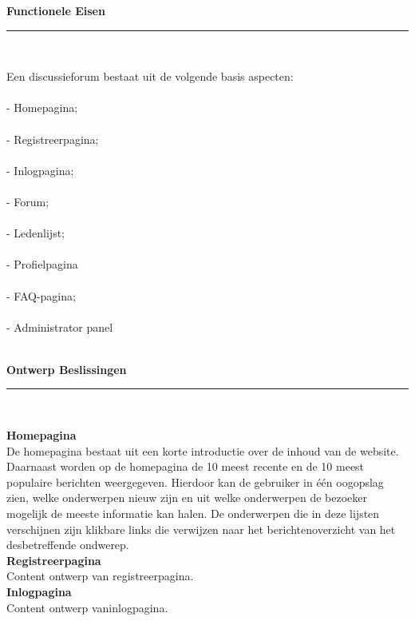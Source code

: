 \documentclass[a4paper,12pt]{article}
\newcommand{\HRule}{\rule{\linewidth}{0.5mm}}
\begin{document}
\newpage
\begin{center}
{ \LARGE \bfseries Functionele Eisen}\\[0.1cm]
\HRule \\[0.5cm]
\end{center}
Een discussieforum bestaat uit de volgende basis aspecten:\\\\
-	Homepagina;\\\\
-	Registreerpagina;\\\\
-	Inlogpagina;\\\\
-	Forum;\\\\
-	Ledenlijst;\\\\
- 	Profielpagina \\\\
-	FAQ-pagina;\\\\
-       Administrator panel\\\\




\newpage
\begin{center}
{ \LARGE \bfseries Ontwerp Beslissingen}\\[0.1cm]
\HRule \\[0.5cm]
\end{center}
{\bfseries Homepagina} \\
De homepagina bestaat uit een korte introductie over de inhoud van de website. Daarnaast worden op de homepagina de 10 meest recente en de 10 meest populaire berichten weergegeven. Hierdoor kan de gebruiker in \'e\'en oogopslag zien, welke onderwerpen nieuw zijn en uit welke onderwerpen de bezoeker mogelijk de meeste informatie kan halen. De onderwerpen die in deze lijsten verschijnen zijn klikbare links die verwijzen naar het berichtenoverzicht van het desbetreffende ondwerep.\\



{\bfseries Registreerpagina}\\
Content ontwerp van registreerpagina.\\

{\bfseries Inlogpagina}\\
Content ontwerp vaninlogpagina.\\
\end{document}
